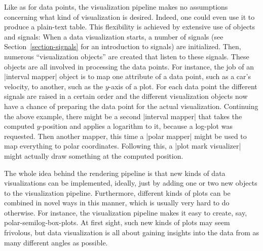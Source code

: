Like as for data points, the visualization pipeline makes no assumptions
concerning what kind of visualization is desired. Indeed, one could even use it
to produce a plain-text table. This flexibility is achieved by extensive use of
objects and signals: When a data visualization starts, a number of signals (see
Section~\ref{section-signals} for an introduction to signals) are initialized.
Then, numerous ``visualization objects'' are created that listen to these
signals. These objects are all involved in processing the data points. For
instance, the job of an |interval mapper| object is to map one attribute of a
data point, such as a car's velocity, to another, such as the $y$-axis of a
plot. For each data point the different signals are raised in a certain order
and the different visualization objects now have a chance of preparing the data
point for the actual visualization. Continuing the above example, there might
be a second |interval mapper| that takes the computed $y$-position and applies
a logarithm to it, because a log-plot was requested. Then another mapper, this
time a |polar mapper| might be used to map everything to polar coordinates.
Following this, a |plot mark visualizer| might actually draw something at the
computed position.

The whole idea behind the rendering pipeline is that new kinds of data
visualizations can be implemented, ideally, just by adding one or two new
objects to the visualization pipeline. Furthermore, different kinds of plots
can be combined in novel ways in this manner, which is usually very
hard to do otherwise.
For instance, the visualization pipeline makes it easy to create, say,
polar-semilog-box-plots. At first sight, such new kinds of plots may seem
frivolous, but data visualization is all about gaining insights into the data
from as many different angles as possible.

